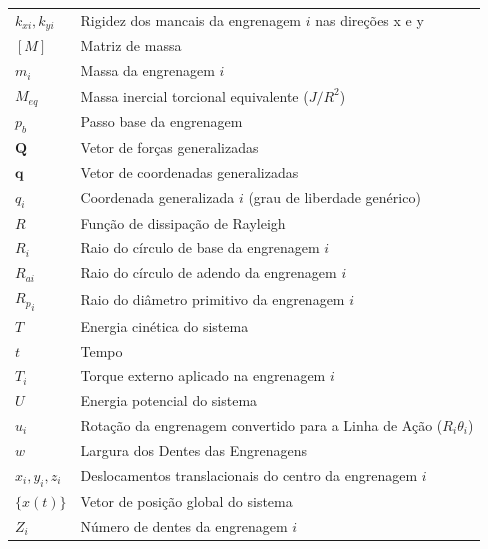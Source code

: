 \begin{longtable}{p{} p{}}
	$ k_{xi}, k_{yi} $ & Rigidez dos mancais da engrenagem $i$ nas direções x e y \\
	$ [M] $ & Matriz de massa \\
	$ m_i $ & Massa da engrenagem $i$ \\
	$ M_{eq} $ & Massa inercial torcional equivalente ($J/R^2$) \\
	$ p_b $ & Passo base da engrenagem \\
	$ \boldsymbol{Q} $ & Vetor de forças generalizadas \\
	$ \boldsymbol{q} $ & Vetor de coordenadas generalizadas \\
	$ q_i $ & Coordenada generalizada $i$ (grau de liberdade genérico) \\
	$ R $ & Função de dissipação de Rayleigh \\
	$ R_i $ & Raio do círculo de base da engrenagem $i$ \\
	$ R_{ai} $ & Raio do círculo de adendo da engrenagem $i$ \\
	${R_p}_i$ & Raio do diâmetro primitivo da engrenagem $i$ \\
	$ T $ & Energia cinética do sistema \\
	$ t $ & Tempo \\
	$ T_i $ & Torque externo aplicado na engrenagem $i$ \\
	$ U $ & Energia potencial do sistema \\
	$ u_i $ & Rotação da engrenagem convertido para a Linha de Ação ($R_i \theta_i$) \\
	$w$ & Largura dos Dentes das Engrenagens \\
	$ x_i, y_i, z_i $ & Deslocamentos translacionais do centro da engrenagem $i$ \\
	$ \{x(t)\} $ & Vetor de posição global do sistema\\
	$Z_i$ & Número de dentes da engrenagem $i$
\end{longtable}
\endgroup

\vspace{\baselineskip}

